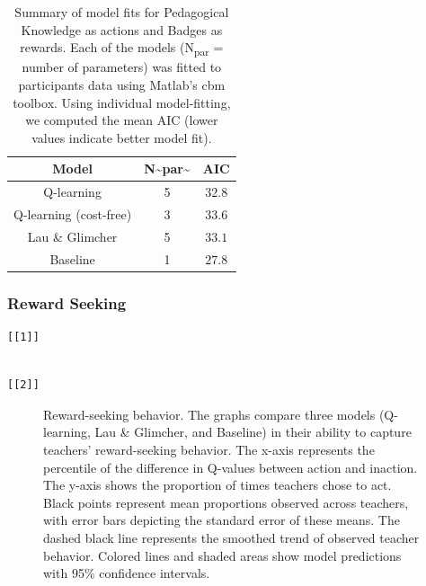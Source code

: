 \documentclass[
  number,
  preprint,
  3p,
  onecolumn]{elsarticle}
\begin{document}
\begin{longtable}{ccc}

\caption{\label{tbl-model-summary}Summary of model fits for Pedagogical
Knowledge as actions and Badges as rewards. Each of the models
(N\textsubscript{par} = number of parameters) was fitted to participants
data using Matlab's cbm toolbox. Using individual model-fitting, we
computed the mean AIC (lower values indicate better model fit).}

\tabularnewline

\toprule
Model & N\textasciitilde{}par\textasciitilde{} & AIC \\ 
\midrule\addlinespace[2.5pt]
Q-learning & 5 & $32.8$ \\ 
Q-learning (cost-free) & 3 & $33.6$ \\ 
Lau \& Glimcher & 5 & $33.1$ \\ 
Baseline & 1 & $27.8$ \\ 
\bottomrule

\end{longtable}

\subsubsection{Reward Seeking}\label{reward-seeking}

\begin{verbatim}
[[1]]
\end{verbatim}

\begin{verbatim}

[[2]]
\end{verbatim}

\begin{figure}


\caption{\label{fig-reward-seeking-1}Reward-seeking behavior. The graphs
compare three models (Q-learning, Lau \& Glimcher, and Baseline) in
their ability to capture teachers' reward-seeking behavior. The x-axis
represents the percentile of the difference in Q-values between action
and inaction. The y-axis shows the proportion of times teachers chose to
act. Black points represent mean proportions observed across teachers,
with error bars depicting the standard error of these means. The dashed
black line represents the smoothed trend of observed teacher behavior.
Colored lines and shaded areas show model predictions with 95\%
confidence intervals.}

\end{figure}%
\end{document}

